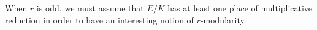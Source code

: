 \documentclass{article}
\def\F{\mathbf{F}}
\begin{document}
%
%

\begin{rmk} When $r$ is odd, we must assume that $E/K$ has at least one place of multiplicative reduction in order to have an interesting notion of $r$-modularity.  
\end{rmk} 

\end{document}
